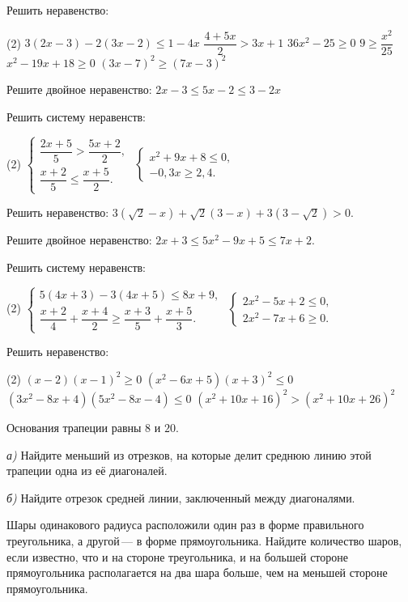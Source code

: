 \begin{class}[number=5]
	\begin{listofex}
		\item Решить неравенство:
		\begin{tasks}(2)
			\task \( 3(2x-3)-2(3x-2)\le1-4x \)
			\task \( \dfrac{4+5x}{2}>3x+1 \)
			\task \( 36x^2-25\ge0 \)
			\task \( 9\ge\dfrac{x^2}{25} \)
			\task \( x^2-19x+18\ge0 \)
			\task \( (3x-7)^2\ge(7x-3)^2 \)
		\end{tasks}
		\item Решите двойное неравенство: \( 2x-3\le5x-2\le3-2x \)
		\item Решить систему неравенств:
		\begin{tasks}(2)
			\task
			\( \left\{
			\begin{array}{l}
				\dfrac{2x+5}{5}>\dfrac{5x+2}{2},\\[0.5em]
				\dfrac{x+2}{5}\le\dfrac{x+5}{2}.
			\end{array}
			\right. \)
			\task
			\( \left\{
			\begin{array}{l}
				x^2+9x+8\le0,\\
				-0,3x\ge2,4.
			\end{array}
			\right. \)
		\end{tasks}
		\item Решить неравенство: \( 3(\sqrt{2}-x)+\sqrt{2}(3-x)+3(3-\sqrt{2})>0 \).
		\item Решите двойное неравенство: \( 2x+3\le5x^2-9x+5\le7x+2 \).
		\item Решить систему неравенств:
		\begin{tasks}(2)
			\task
			\( \left\{
			\begin{array}{l}
				5(4x+3)-3(4x+5)\le8x+9,\\
				\dfrac{x+2}{4}+\dfrac{x+4}{2}\ge\dfrac{x+3}{5}+\dfrac{x+5}{3}.
			\end{array}
			\right. \)
			\task
			\( \left\{
			\begin{array}{l}
				2x^2-5x+2\le0,\\
				2x^2-7x+6\ge0.
			\end{array}
			\right. \)
		\end{tasks}
		\item Решить неравенство:
		\begin{tasks}(2)
			\task \( (x-2)(x-1)^2\ge0 \)
			\task \( (x^2-6x+5)(x+3)^2\le0 \)
			\task \( (3x^2-8x+4)(5x^2-8x-4)\le0 \)
			\task \( (x^2+10x+16)^2>(x^2+10x+26)^2 \)
		\end{tasks}
		\item Основания трапеции равны \( 8 \) и \( 20 \).
		
		\textit{а)} Найдите меньший из отрезков, на которые делит среднюю линию этой трапеции одна из её диагоналей.
		
		\textit{б)} Найдите отрезок средней линии, заключенный между диагоналями.
		\item Шары одинакового радиуса расположили один раз в форме правильного треугольника, а другой --- в форме прямоугольника. Найдите количество шаров, если известно, что и на стороне треугольника, и на большей стороне прямоугольника располагается на два шара больше, чем на меньшей стороне прямоугольника.
	\end{listofex}
\end{class}
